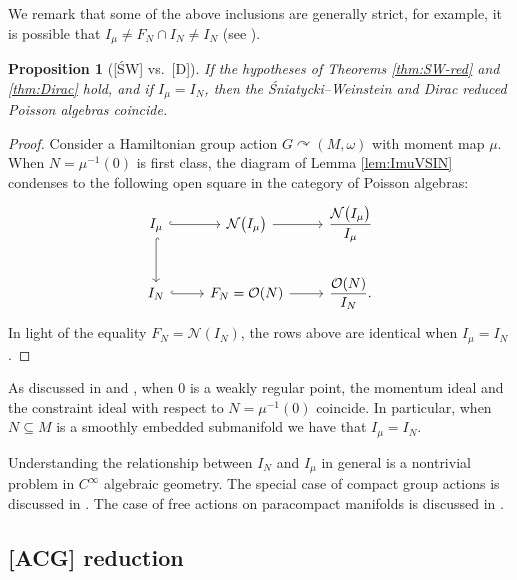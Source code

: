 \documentclass[pdftex]{sigma}
\numberwithin{equation}{section}
\newtheorem{Proposition}[Theorem]{Proposition}
 { \theoremstyle{definition}
\newtheorem{Definition}[Theorem]{Definition}
\newtheorem{Note}[Theorem]{Note}
\newtheorem{Example}[Theorem]{Example}
\newtheorem{Remark}[Theorem]{Remark} }
\DeclareMathOperator{\action}{\curvearrowright}
\renewcommand{\subset}{\subseteq}
\begin{document}
We remark that some of the above inclusions are generally strict, for example, it is possible that $I_{\mu}\neq F_N\cap I_N \neq I_{N}$ (see \cite[Section~7]{ArmsGotayJennings90}).

\begin{Proposition}[{[\'SW] vs.\ [D]}]
	If the hypotheses of Theorems {\rm \ref{thm:SW-red}} and {\rm \ref{thm:Dirac}} hold, and if $I_\mu= I_N$, then the \'Sniatycki--Weinstein and Dirac reduced Poisson algebras coincide.
\end{Proposition}

\begin{proof}
	Consider a Hamiltonian group action $G\action (M,\omega)$ with moment map $\mu$.
	When $N=\mu^{-1}(0)$ is first class, the diagram of Lemma \ref{lem:ImuVSIN} condenses to the following open square in the category of Poisson algebras:
	\begin{displaymath}
		\begin{tikzcd}
			I_\mu \ar[r,hook] \ar[d,hook]&
			\mathcal{N}\bigl(I_\mu\bigr) \ar[r] &
			\dfrac{\mathcal{N}\bigl(I_\mu\bigr)}{I_\mu}
			\\
			I_N\ar[r,hook] &
			F_N = \mathcal{O}(N) \ar[r] &
			\dfrac{\mathcal{O}(N)}{I_N}.
		\end{tikzcd}
	\end{displaymath}
	In light of the equality $F_N = \mathcal{N}(I_N)$, the rows above are identical when $I_\mu=I_N$.
\end{proof}

\begin{Remark}[on the technical condition $I_\mu = I_N $]
	As discussed in \cite[Theorem~1]{SniatyckiWeinstein83} and \cite[Corollary~6.2]{ArmsGotayJennings90}, when $0$ is a weakly regular point, the momentum ideal and the constraint ideal with respect to $N=\mu^{-1}(0)$ coincide.
	In particular, when $N\subset M$ is a smoothly embedded submanifold we have that $I_\mu=I_N$.
	
	Understanding the relationship between $I_N$ and $I_\mu$ in general is a nontrivial problem in $C^\infty$ algebraic geometry. The special case of compact group actions is discussed in \cite[Sections~5 and~6]{ArmsGotayJennings90}. The case of free actions on paracompact manifolds is discussed in \cite[Lemma~2]{Sniatycki05}.
\end{Remark}


\subsection{{[ACG]} reduction}\label{Ssec:ACG-red}
\end{document}
